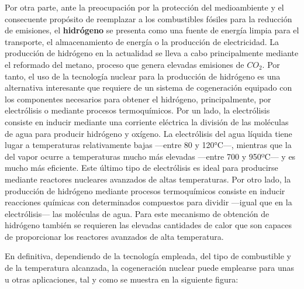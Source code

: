 Por otra parte, ante la preocupación por la protección del medioambiente y el consecuente propósito de reemplazar a los combustibles fósiles para la reducción de emisiones, el \textbf{hidrógeno} se presenta como una fuente de energía limpia para el transporte, el almacenamiento de energía o la producción de electricidad. La producción de hidrógeno en la actualidad se lleva a cabo principalmente mediante el reformado del metano, proceso que genera elevadas emisiones de $CO_2$. Por tanto, el uso de la tecnología nuclear para la producción de hidrógeno es una alternativa interesante que requiere de un sistema de cogeneración equipado con los componentes necesarios para obtener el hidrógeno, principalmente, por electrólisis o mediante procesos termoquímicos. Por un lado, la electrólisis consiste en inducir mediante una corriente eléctrica la división de las moléculas de agua para producir hidrógeno y oxígeno. La electrólisis del agua líquida tiene lugar a temperaturas relativamente bajas ---entre 80 y 120°C---, mientras que la del vapor ocurre a temperaturas mucho más elevadas ---entre 700 y 950ºC--- y es mucho más eficiente. Este último tipo de electrólisis es ideal para producirse mediante reactores nucleares avanzados de altas temperaturas. Por otro lado, la producción de hidrógeno mediante procesos termoquímicos consiste en inducir reacciones químicas con determinados compuestos para dividir ---igual que en la electrólisis--- las moléculas de agua. Para este mecanismo de obtención de hidrógeno también se requieren las elevadas cantidades de calor que son capaces de proporcionar los reactores avanzados de alta temperatura.

En definitiva, dependiendo de la tecnología empleada, del tipo de combustible y de la temperatura alcanzada, la cogeneración nuclear puede emplearse para unas u otras aplicaciones, tal y como se muestra en la siguiente figura:


